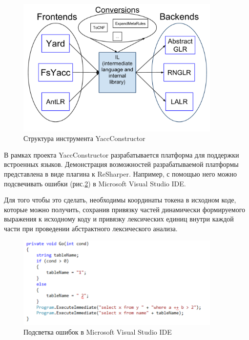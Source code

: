 \documentclass{matmex-diploma}
\begin{document}
\begin{itemize}
\begin{figure}[h]
\begin{center}
\includegraphics[width=0.9\textwidth]{YC_base}
\caption{Структура инструмента YaccConstructor}
\label{fig:YC_base} 
\end{center}
\end{figure}


В рамках проекта YaccConstructor разрабатывается платформа для поддержки встроенных языков. Демонстрация возможностей разрабатываемой платформы 
представлена в виде плагина к ReSharper. Например, с помощью него можно подсвечивать ошибки (рис.\ref{fig:ReSharper}) в Microsoft Visual Studio IDE. 

Для того чтобы это сделать, необходимы координаты токена в исходном коде, которые можно получить, сохранив привязку частей динамически формируемого
выражения к исходному коду и привязку лексических единиц внутри каждой части при проведении абстрактного лексического анализа.

\begin{figure}[h!]
\begin{center}
\includegraphics[width=0.9\textwidth]{ReSharper}
\caption{Подсветка ошибок в Microsoft Visual Studio IDE}
\label{fig:ReSharper} 
\end{center}
\end{figure}

\end{itemize}
\end{document}
